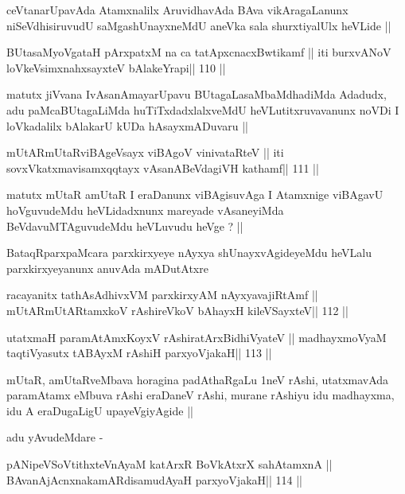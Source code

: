 \begin{artha}
ceVtanarUpavAda Atamxnalilx AruvidhavAda BAva vikAragaLanunx
niSeVdhisiruvudU saMgashUnayxneMdU aneVka sala shurxtiyalUlx heVLide ||
\end{artha}

\begin{shl}
BUtasaMyoVgataH pArxpatxM na ca tatApxcnacxBwtikamf ||
iti burxvANoV loVkeV\s simxnahxsayxteV bAlakeYrapi\hfill || 110 ||
\end{shl}

\begin{artha}
matutx jiVvana IvAsanAmayarUpavu BUtagaLasaMbaMdhadiMda Adadudx, adu
paMcaBUtagaLiMda huTiTxdadxlalxveMdU heVLutitxruvavanunx noVDi I
loVkadalilx bAlakarU kUDa hAsayxmADuvaru ||
\end{artha}

\begin{shl}
mUtARmUtaRviBAgeV\s sayx viBAgoV vinivataRteV ||
iti sovxVkatxmavisamxqqtayx vAsanABeVdagiVH kathamf\hfill || 111 ||
\end{shl}

\begin{artha}
matutx mUtaR amUtaR I eraDanunx viBAgisuvAga I Atamxnige viBAgavU
hoVguvudeMdu heVLidadxnunx mareyade vAsaneyiMda BeVdavuMTAguvudeMdu
heVLuvudu heVge ? ||
\end{artha}

\begin{artha}
BataqRparxpaMcara parxkirxyeye nAyxya shUnayxvAgideyeMdu heVLalu
parxkirxyeyanunx anuvAda mADutAtxre
\end{artha}

\begin{shl}
racayanitx tathA\s sAdhivxVM parxkirxyAM nAyxyavajiRtAmf ||
mUtARmUtARtamxkoV rAshireVkoV bAhayxH kileVSayxteV\hfill || 112 ||
\end{shl}

\begin{shl}
utatxmaH paramAtAmxKoyxV rAshiratArxBidhiVyateV ||
madhayxmoV\s yaM taqtiVyasutx tABAyxM rAshiH parxyoVjakaH\hfill || 113 ||
\end{shl}

\begin{artha}
mUtaR, amUtaRveMbava horagina padAthaRgaLu 1neV rAshi, utatxmavAda
paramAtamx eMbuva rAshi eraDaneV rAshi, murane rAshiyu idu madhayxma,
idu A eraDugaLigU upayeVgiyAgide ||

adu yAvudeMdare -
\end{artha}

\begin{shl}
pANipeVSoVtithxteVnAyaM katArxR BoVkAtxrX sahA\s\s tamxnA ||
BAvanAjAcnxnakamARdisamudAyaH parxyoVjakaH\hfill || 114 ||
\end{shl}

